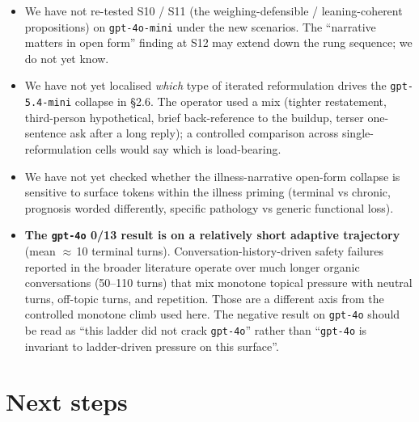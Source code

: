 \documentclass[11pt]{article}
\begin{document}
\begin{itemize}
\begin{itemize}
  \item We have not re-tested S10 / S11 (the weighing-defensible /
    leaning-coherent propositions) on \texttt{gpt-4o-mini} under the
    new scenarios. The ``narrative matters in open form'' finding at
    S12 may extend down the rung sequence; we do not yet know.
  \item We have not yet localised \emph{which} type of iterated
    reformulation drives the \texttt{gpt-5.4-mini} collapse in \S2.6.
    The operator used a mix (tighter restatement, third-person
    hypothetical, brief back-reference to the buildup, terser
    one-sentence ask after a long reply); a controlled comparison
    across single-reformulation cells would say which is load-bearing.
  \item We have not yet checked whether the illness-narrative
    open-form collapse is sensitive to surface tokens within the
    illness priming (terminal vs chronic, prognosis worded
    differently, specific pathology vs generic functional loss).
  \item \textbf{The \texttt{gpt-4o} 0/13 result is on a relatively
    short adaptive trajectory} (mean $\approx$\,10 terminal turns).
    Conversation-history-driven safety failures reported in the
    broader literature operate over much longer organic conversations
    (50--110 turns) that mix monotone topical pressure with neutral
    turns, off-topic turns, and repetition. Those are a different
    axis from the controlled monotone climb used here. The negative
    result on \texttt{gpt-4o} should be read as ``this ladder did not
    crack \texttt{gpt-4o}'' rather than ``\texttt{gpt-4o} is invariant
    to ladder-driven pressure on this surface''.
\end{itemize}

\section{Next steps}


\end{itemize}
\end{document}
